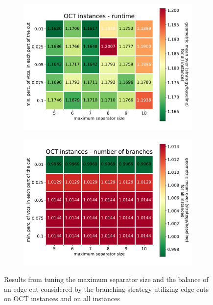 \documentclass[12pt,a4paper,twoside]{scrartcl}
\numberwithin{equation}{section}
\begin{document}
\begin{figure}[htb!]
\begin{subfigure}{0.475\textwidth}
		\includegraphics[width=\textwidth]{images/plots/st_tune_oct_t}
	\end{subfigure}
	\begin{subfigure}{0.475\textwidth}
		\includegraphics[width=\textwidth]{images/plots/st_tune_oct_b}
	\end{subfigure}
	\caption{Results from tuning the maximum separator size and the balance of an edge cut considered by the branching strategy utilizing edge cuts on OCT instances and on all instances}	
	\label{st2}
	
\end{figure}
\end{document}
